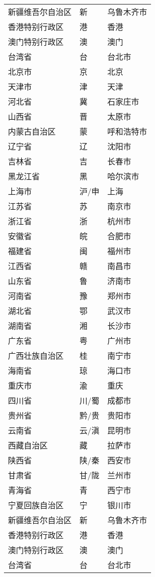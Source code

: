 \begin{longtable}{l@{\hspace{6.5mm}}l@{\hspace{5.5mm}}l}
新疆维吾尔自治区 & 新 & 乌鲁木齐市\\
香港特别行政区 & 港 & 香港\\
澳门特别行政区 & 澳 & 澳门\\
台湾省 & 台 & 台北市\\
北京市 & 京 & 北京\\
天津市 & 津 & 天津\\
河北省 & 冀 & 石家庄市\\
山西省 & 晋 & 太原市\\
内蒙古自治区 & 蒙 & 呼和浩特市\\
辽宁省 & 辽 & 沈阳市\\
吉林省 & 吉 & 长春市\\
黑龙江省 & 黑 & 哈尔滨市\\
上海市 & 沪/申 & 上海\\
江苏省 & 苏 & 南京市\\
浙江省 & 浙 & 杭州市\\
安徽省 & 皖 & 合肥市\\
福建省 & 闽 & 福州市\\
江西省 & 赣 & 南昌市\\
山东省 & 鲁 & 济南市\\
河南省 & 豫 & 郑州市\\
湖北省 & 鄂 & 武汉市\\
湖南省 & 湘 & 长沙市\\
广东省 & 粤 & 广州市\\
广西壮族自治区 & 桂 & 南宁市\\
海南省 & 琼 & 海口市\\
重庆市 & 渝 & 重庆\\
四川省 & 川/蜀 & 成都市\\
贵州省 & 黔/贵 & 贵阳市\\
云南省 & 云/滇 & 昆明市\\
西藏自治区 & 藏 & 拉萨市\\
陕西省 & 陕/秦 & 西安市\\
甘肃省 & 甘/陇 & 兰州市\\
青海省 & 青 & 西宁市\\
宁夏回族自治区 & 宁 & 银川市\\
新疆维吾尔自治区 & 新 & 乌鲁木齐市\\
香港特别行政区 & 港 & 香港\\
澳门特别行政区 & 澳 & 澳门\\
台湾省 & 台 & 台北市\\
\end{longtable}
